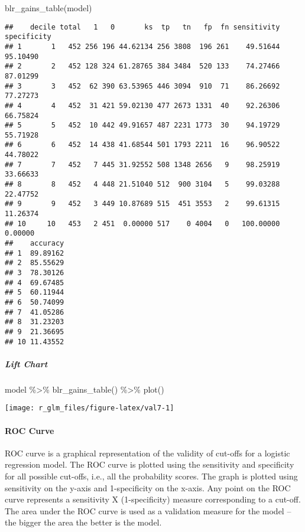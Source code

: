 \documentclass[
]{article}
\newenvironment{Shaded}{\begin{snugshade}}{\end{snugshade}}
\newcommand{\FunctionTok}[1]{\textcolor[rgb]{0.00,0.00,0.00}{#1}}
\newcommand{\NormalTok}[1]{#1}
\newcommand{\SpecialCharTok}[1]{\textcolor[rgb]{0.00,0.00,0.00}{#1}}
\begin{document}
\begin{Shaded}
\begin{Highlighting}[]
\FunctionTok{blr\_gains\_table}\NormalTok{(model)}
\end{Highlighting}
\end{Shaded}

\begin{verbatim}
##    decile total   1   0       ks  tp   tn   fp  fn sensitivity specificity
## 1       1   452 256 196 44.62134 256 3808  196 261    49.51644    95.10490
## 2       2   452 128 324 61.28765 384 3484  520 133    74.27466    87.01299
## 3       3   452  62 390 63.53965 446 3094  910  71    86.26692    77.27273
## 4       4   452  31 421 59.02130 477 2673 1331  40    92.26306    66.75824
## 5       5   452  10 442 49.91657 487 2231 1773  30    94.19729    55.71928
## 6       6   452  14 438 41.68544 501 1793 2211  16    96.90522    44.78022
## 7       7   452   7 445 31.92552 508 1348 2656   9    98.25919    33.66633
## 8       8   452   4 448 21.51040 512  900 3104   5    99.03288    22.47752
## 9       9   452   3 449 10.87689 515  451 3553   2    99.61315    11.26374
## 10     10   453   2 451  0.00000 517    0 4004   0   100.00000     0.00000
##    accuracy
## 1  89.89162
## 2  85.55629
## 3  78.30126
## 4  69.67485
## 5  60.11944
## 6  50.74099
## 7  41.05286
## 8  31.23203
## 9  21.36695
## 10 11.43552
\end{verbatim}

\hypertarget{lift-chart}{%
\subparagraph{Lift Chart}\label{lift-chart}}

\begin{Shaded}
\begin{Highlighting}[]
\NormalTok{model }\SpecialCharTok{\%\textgreater{}\%}
    \FunctionTok{blr\_gains\_table}\NormalTok{() }\SpecialCharTok{\%\textgreater{}\%}
    \FunctionTok{plot}\NormalTok{()}
\end{Highlighting}
\end{Shaded}

\begin{center}\texttt{[image: r\_glm\_files/figure-latex/val7-1]} \end{center}

\hypertarget{roc-curve}{%
\paragraph{ROC Curve}\label{roc-curve}}

ROC curve is a graphical representation of the validity of cut-offs for
a logistic regression model. The ROC curve is plotted using the
sensitivity and specificity for all possible cut-offs, i.e., all the
probability scores. The graph is plotted using sensitivity on the y-axis
and 1-specificity on the x-axis. Any point on the ROC curve represents a
sensitivity X (1-specificity) measure corresponding to a cut-off. The
area under the ROC curve is used as a validation measure for the model
-- the bigger the area the better is the model.
\end{document}
